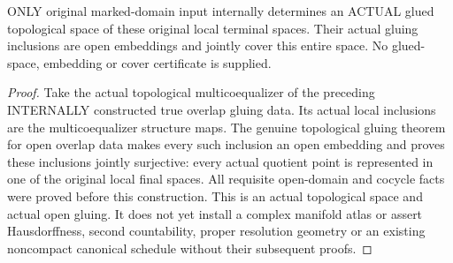 \begin{theorem}
\label{hir:original-input-local-terminal-actual-glued-topological-space}
\leanok
ONLY original marked-domain input internally determines an ACTUAL glued
topological space of these original local terminal spaces. Their actual
gluing inclusions are open embeddings and jointly cover this entire space.
No glued-space, embedding or cover certificate is supplied.
\end{theorem}
\begin{proof}
Take the actual topological multicoequalizer of the preceding INTERNALLY
constructed true overlap gluing data. Its actual local inclusions are the
multicoequalizer structure maps. The genuine topological gluing theorem
for open overlap data makes every such inclusion an open embedding and
proves these inclusions jointly surjective: every actual quotient point
is represented in one of the original local final spaces. All requisite
open-domain and cocycle facts were proved before this construction.
This is an actual topological space and actual open gluing. It does not
yet install a complex manifold atlas or assert Hausdorffness, second
countability, proper resolution geometry or an existing noncompact
canonical schedule without their subsequent proofs.
\end{proof}

